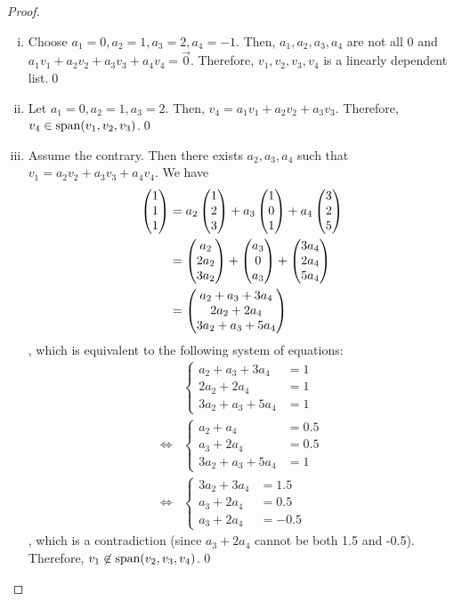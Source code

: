 \begin{proof}
    \renewcommand{\qedsymbol}{$ $}
    \begin{enumerate}[(i)]
        \renewcommand{\qedsymbol}{$\blacksquare$}
        \item Choose $a_1=0, a_2=1, a_3=2, a_4=-1$. Then, $a_1,a_2,a_3,a_4$ are not all 0 and $a_1v_1+a_2v_2+a_3v_3+a_4v_4=\vec{0}$. Therefore, $v_1,v_2,v_3,v_4$ is a linearly dependent list.\qed
        \item Let $a_1=0, a_2=1, a_3=2$. Then, $v_4=a_1v_1+a_2v_2+a_3v_3$. Therefore, $v_4\in\textnormal{span}(v_1,v_2,v_3)$.\qed
        \item Assume the contrary. Then there exists $a_2,a_3,a_4$ such that $v_1=a_2v_2+a_3v_3+a_4v_4$. We have
              \[
                  \begin{aligned}
                      \begin{pmatrix} 1\\ 1\\ 1\end{pmatrix} & = a_2 \begin{pmatrix} 1\\ 2\\ 3\end{pmatrix}+a_3 \begin{pmatrix} 1\\ 0\\ 1\end{pmatrix}+a_4 \begin{pmatrix} 3\\ 2\\ 5\end{pmatrix}          \\
                                            & = \begin{pmatrix} a_2\\ 2a_2\\ 3a_2\end{pmatrix}+\begin{pmatrix} a_3\\ 0\\ a_3\end{pmatrix}+\begin{pmatrix} 3a_4\\ 2a_4\\ 5a_4\end{pmatrix} \\
                                            & = \begin{pmatrix} a_2+a_3+3a_4\\ 2a_2+2a_4\\ 3a_2+a_3+5a_4\end{pmatrix}
                  \end{aligned}
              \]
              , which is equivalent to the following system of equations:
              \begin{align*}
                   & \begin{cases}
                         a_2+a_3+3a_4  & = 1 \\
                         2a_2+2a_4     & = 1 \\
                         3a_2+a_3+5a_4 & = 1
                     \end{cases}   \\
                  \iff
                   & \begin{cases}
                         a_2+a_4       & = 0.5 \\
                         a_3+2a_4      & = 0.5 \\
                         3a_2+a_3+5a_4 & = 1
                     \end{cases} \\
                  \iff
                   & \begin{cases}
                         3a_2+3a_4 & = 1.5  \\
                         a_3+2a_4  & = 0.5  \\
                         a_3+2a_4  & = -0.5
                     \end{cases}
              \end{align*}
              , which is a contradiction (since $a_3+2a_4$ cannot be both 1.5 and -0.5). Therefore, $v_1\not\in\textnormal{span}{(v_2,v_3,v_4)}$.\qed
    \end{enumerate}
\end{proof}